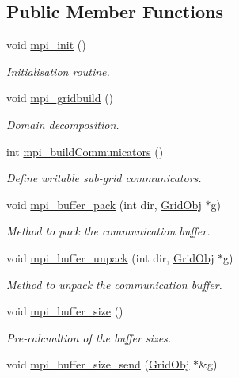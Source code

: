 \subsection*{Public Member Functions}
\begin{DoxyCompactItemize}
\item 
void \hyperlink{class_mpi_manager_a02adaa06e139dfca2bc71e1a1dbf25c7}{mpi\+\_\+init} ()
\begin{DoxyCompactList}\small\item\em Initialisation routine. \end{DoxyCompactList}\item 
void \hyperlink{class_mpi_manager_a7f07e85131147b55eec643c791ec2ba0}{mpi\+\_\+gridbuild} ()
\begin{DoxyCompactList}\small\item\em Domain decomposition. \end{DoxyCompactList}\item 
int \hyperlink{class_mpi_manager_a749fa958cb7343183a69ca6191b45286}{mpi\+\_\+build\+Communicators} ()
\begin{DoxyCompactList}\small\item\em Define writable sub-\/grid communicators. \end{DoxyCompactList}\item 
void \hyperlink{class_mpi_manager_ae1b33a4a24d9abf528528a296aa1d92d}{mpi\+\_\+buffer\+\_\+pack} (int dir, \hyperlink{class_grid_obj}{Grid\+Obj} $\ast$g)
\begin{DoxyCompactList}\small\item\em Method to pack the communication buffer. \end{DoxyCompactList}\item 
void \hyperlink{class_mpi_manager_abf5e0511918b4ae6ec524d737618e341}{mpi\+\_\+buffer\+\_\+unpack} (int dir, \hyperlink{class_grid_obj}{Grid\+Obj} $\ast$g)
\begin{DoxyCompactList}\small\item\em Method to unpack the communication buffer. \end{DoxyCompactList}\item 
void \hyperlink{class_mpi_manager_a1bf713399e26a5ffbc03147e0a20c585}{mpi\+\_\+buffer\+\_\+size} ()
\begin{DoxyCompactList}\small\item\em Pre-\/calcualtion of the buffer sizes. \end{DoxyCompactList}\item 
void \hyperlink{class_mpi_manager_af26d2a0a2430f7c1b5def5f954a10f1d}{mpi\+\_\+buffer\+\_\+size\+\_\+send} (\hyperlink{class_grid_obj}{Grid\+Obj} $\ast$\&g)

\end{DoxyCompactItemize}
